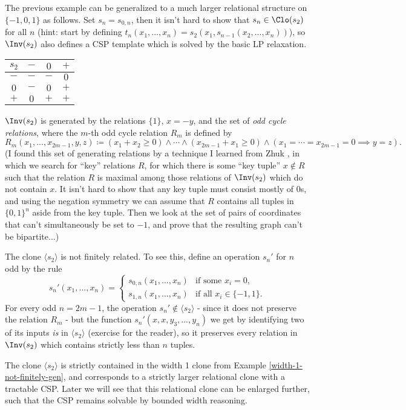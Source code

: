 \begin{ex}\label{lp-not-width-1} The previous example can be generalized to a much larger relational structure on $\{-1,0,1\}$ as follows. Set $s_n = s_{0,n}$, then it isn't hard to show that $s_n \in \Clo(s_2)$ for all $n$ (hint: start by defining $t_n(x_1, ..., x_n) = s_2(x_1,s_{n-1}(x_2, ..., x_n))$), so $\Inv(s_2)$ also defines a CSP template which is solved by the basic LP relaxation.

\begin{center}
\begin{tabular}{c|ccc} $s_2$ & $-$ & $0$ & $+$\\ \hline $-$ & $-$ & $-$ & $0$\\ $0$ & $-$ & $0$ & $+$\\ $+$ & $0$ & $+$ & $+$\end{tabular}
\end{center}

$\Inv(s_2)$ is generated by the relations $\{1\}$, $x = -y$, and the set of \emph{odd cycle relations}, where the $m$-th odd cycle relation $R_m$ is defined by
\[
R_m(x_1, ..., x_{2m-1},y,z) \coloneqq (x_1 + x_2 \ge 0) \wedge \cdots \wedge (x_{2m-1} + x_1 \ge 0) \wedge (x_1 = \cdots = x_{2m-1} = 0 \implies y = z).
\]
(I found this set of generating relations by a technique I learned from Zhuk \cite{zhuk-key}, in which we search for ``key'' relations $R$, for which there is some ``key tuple'' $x \not\in R$ such that the relation $R$ is maximal among those relations of $\Inv(s_2)$ which do not contain $x$. It isn't hard to show that any key tuple must consist mostly of $0$s, and using the negation symmetry we can assume that $R$ contains all tuples in $\{0,1\}^n$ aside from the key tuple. Then we look at the set of pairs of coordinates that can't simultaneously be set to $-1$, and prove that the resulting graph can't be bipartite...)

The clone $\langle s_2 \rangle$ is not finitely related. To see this, define an operation $s_n'$ for $n$ odd by the rule
\[
s_n'(x_1, ..., x_n) = \begin{cases}s_{0,n}(x_1, ..., x_n) & \text{if some }x_i = 0,\\ s_{1,n}(x_1, ..., x_n) & \text{if all } x_i \in \{-1,1\}.\end{cases}
\]
For every odd $n = 2m-1$, the operation $s_n' \not\in \langle s_2 \rangle$ - since it does not preserve the relation $R_m$ - but the function $s_n'(x,x,y_3,...,y_n)$ we get by identifying two of its inputs \emph{is} in $\langle s_2 \rangle$ (exercise for the reader), so it preserves every relation in $\Inv(s_2)$ which contains strictly less than $n$ tuples.

The clone $\langle s_2 \rangle$ is strictly contained in the width 1 clone from Example \ref{width-1-not-finitely-gen}, and corresponds to a strictly larger relational clone with a tractable CSP. Later we will see that this relational clone can be enlarged further, such that the CSP remains solvable by bounded width reasoning.
\end{ex}

